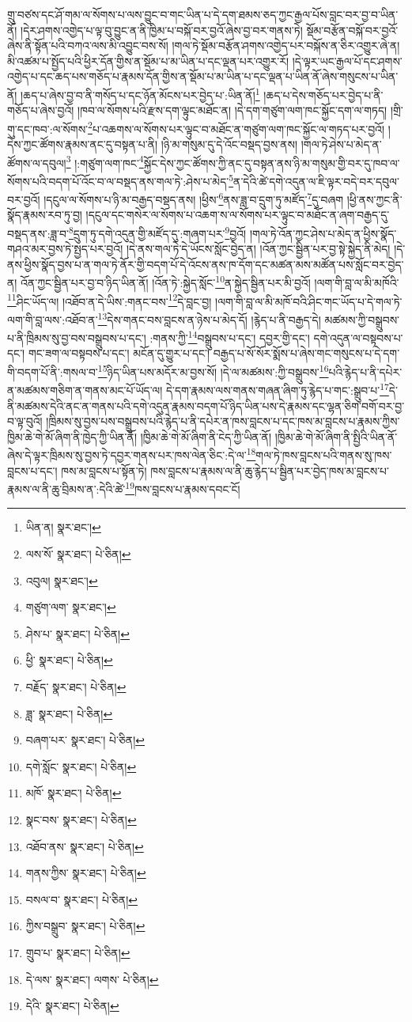 གྲུ་བཙས་དང་ཤོ་གམ་ལ་སོགས་པ་ལས་བྱུང་བ་གང་ཡིན་པ་དེ་དག་ཐམས་ཅད་ཀྱང་རྒྱལ་པོས་བླང་བར་བྱ་བ་ཡིན་ནོ། །དེར་ཤགས་འགྱེད་པ་ལྟ་བུ་བྱུང་ན་ནི་ཁྱིམ་པ་བསྐོ་བར་བྱའོ་ཞེས་བྱ་བར་གནས་ཏེ། སྡོམ་བརྩོན་བསྐོ་བར་བྱའོ་ཞེས་ནི་སྟོན་པའི་བཀའ་ལས་མི་འབྱུང་བས་སོ། །གལ་ཏེ་སྡོམ་བརྩོན་ཤགས་འགྱེད་པར་བསྐོས་ན་ཅིར་འགྱུར་ཞེ་ན། མི་འཚམ་པ་སྤྱོད་པའི་ཕྱིར་དོན་གྱིས་ན་སྡོམ་པ་མ་ཡིན་པ་དང་ལྡན་པར་འགྱུར་རོ། །དེ་ལྟར་ཡང་རྒྱལ་པོ་དང་ཤགས་འགྱེད་པ་དང་ཆད་པས་གཅོད་པ་རྣམས་དོན་གྱིས་ན་སྡོམ་པ་མ་ཡིན་པ་དང་ལྡན་པ་ཡིན་ནོ་ཞེས་གསུངས་པ་ཡིན་ནོ། །ཆད་པ་ཞེས་བྱ་བ་ནི་གསོད་པ་དང་ཉོན་མོངས་པར་བྱེད་པ་:ཡིན་ནོ།\footnote{ཡིན་ན།  སྣར་ཐང་། } །ཆད་པ་དེས་གཅོད་པར་བྱེད་པ་ནི་གཅོད་པ་ཞེས་བྱའོ། །ཁབ་ལ་སོགས་པའི་རྫས་དག་ལྟུང་མཐོང་ན། །དེ་དག་གཙུག་ལག་ཁང་སྐྱོང་དག་ལ་གཏད། །གྲི་གུ་དང་ཁབ་:ལ་སོགས་\footnote{ལས་སོ་  སྣར་ཐང་།  པེ་ཅིན། }པ་འཆགས་ལ་སོགས་པར་ལྟུང་བ་མཐོང་ན་གཙུག་ལག་ཁང་སྐྱོང་ལ་གཏད་པར་བྱའོ། །དེས་ཀྱང་ཚོགས་རྣམས་ནང་དུ་བསྟན་པ་ནི། །ཉི་མ་གསུམ་དུ་དེ་འོང་བསྡད་བྱས་ནས། །གལ་ཏེ་ཤེས་པ་མེད་ན་ཚོགས་ལ་དབུལ།\footnote{འབུལ།  སྣར་ཐང་། } །:གཙུག་ལག་ཁང་\footnote{གཙུག་ལག་  སྣར་ཐང་། }སྐྱོང་དེས་ཀྱང་ཚོགས་ཀྱི་ནང་དུ་བསྟན་ནས་ཉི་མ་གསུམ་གྱི་བར་དུ་ཁབ་ལ་སོགས་པའི་བདག་པོ་འོང་བ་ལ་བསྡད་ནས་གལ་ཏེ་:ཤེས་པ་མེད་\footnote{ཤེས་པ་  སྣར་ཐང་།  པེ་ཅིན། }ན་དེའི་ཚེ་དགེ་འདུན་ལ་ཇི་ལྟར་བདེ་བར་དབུལ་བར་བྱའོ། །དངུལ་ལ་སོགས་པ་ཉི་མ་བརྒྱད་བསྡད་ནས། །ཕྱིས་\footnote{ཕྱི་  སྣར་ཐང་།  པེ་ཅིན། }ནས་ཟླ་བ་དྲུག་ཏུ་མཛོད་\footnote{བརྗོད་  སྣར་ཐང་།  པེ་ཅིན། }དུ་བཞག །ཕྱི་ནས་ཀྱང་ནི་སྣོད་རྣམས་རབ་ཏུ་བྱ། །དངུལ་དང་གསེར་ལ་སོགས་པ་འཆག་ས་ལ་སོགས་པར་ལྟུང་བ་མཐོང་ན་ཞག་བརྒྱད་དུ་བསྡད་ནས་:ཟླ་བ་\footnote{ཟླ་  སྣར་ཐང་།  པེ་ཅིན། }དྲུག་ཏུ་དགེ་འདུན་གྱི་མཛོད་དུ་:གཞག་པར་\footnote{བཞག་པར་  སྣར་ཐང་།  པེ་ཅིན། }བྱའོ། །གལ་ཏེ་འོན་ཀྱང་ཤེས་པ་མེད་ན་ཕྱིས་སྣོད་གཤའ་མར་བྱས་ཏེ་སྤྱད་པར་བྱའོ། །དེ་ནས་གལ་ཏེ་དེ་ཡོངས་སློང་བྱེད་ན། །འོན་ཀྱང་སྦྱིན་པར་བྱ་སྟེ་སྐྱེད་ནི་མེད། །དེ་ནས་ཕྱིས་སྣོད་བྱས་པ་ན་གལ་ཏེ་ནོར་གྱི་བདག་པོ་དེ་འོངས་ནས་ཁ་དོག་དང་མཚན་མས་མཚོན་པས་སློང་བར་བྱེད་ན། འོན་ཀྱང་སྦྱིན་པར་བྱ་བ་ཉིད་ཡིན་ནོ། །འོན་ཏེ་:སྐྱེད་སློང་\footnote{དགེ་སློང་  སྣར་ཐང་།  པེ་ཅིན། }ན་སྐྱེད་སྦྱིན་པར་མི་བྱའོ། །ལག་གི་བླ་ལ་མི་མཁོའི་\footnote{མཁོ་  སྣར་ཐང་།  པེ་ཅིན། }ཤིང་ཡོད་ལ། །འཐོབ་ན་དེ་ཡིས་:གནང་བས་\footnote{སྣང་བས་  སྣར་ཐང་།  པེ་ཅིན། }དེ་བླང་བྱ། །ལག་གི་བླ་ལ་མི་མཁོ་བའི་ཤིང་གང་ཡོད་པ་དེ་གལ་ཏེ་ལག་གི་བླ་ལས་:འཐོབ་ན་\footnote{འཐོབ་ནས་  སྣར་ཐང་།  པེ་ཅིན། }དེས་གནང་བས་བླངས་ན་ཉེས་པ་མེད་དོ། །རྙེད་པ་ནི་བརྒྱད་དེ། མཚམས་ཀྱི་བསྒྲུབས་པ་ནི་ཁྲིམས་སུ་བྱ་བས་བསྒྲུབས་པ་དང་། :གནས་ཀྱི་\footnote{གནས་ཀྱིས་  སྣར་ཐང་།  པེ་ཅིན། }བསྒྲུབས་པ་དང་། དབྱར་གྱི་དང་། དགེ་འདུན་ལ་བསྟབས་པ་དང་། གང་ཟག་ལ་བསྟབས་པ་དང་། མངོན་དུ་གྱུར་པ་དང་། བརྒྱད་པ་སོ་སོར་སྨོས་པ་ཞེས་གང་གསུངས་པ་དེ་དག་གི་བདག་པོ་ནི་:གསལ་བ་\footnote{བསལ་བ་  སྣར་ཐང་།  པེ་ཅིན། }ཉིད་ཡིན་པས་མདོར་མ་བྱས་སོ། །དེ་ལ་མཚམས་:ཀྱི་བསྒྲུབས་\footnote{ཀྱིས་བསྒྲུབ་  སྣར་ཐང་།  པེ་ཅིན། }པའི་རྙེད་པ་ནི་དཔེར་ན་མཚམས་གཅིག་ན་གནས་མང་པོ་ཡོད་ལ། དེ་དག་རྣམས་ལས་གནས་གཞན་ཞིག་ཏུ་རྙེད་པ་གང་:སྒྲུབ་པ་\footnote{གྲུབ་པ་  སྣར་ཐང་།  པེ་ཅིན། }དེ་ནི་མཚམས་དེའི་ནང་ན་གནས་པའི་དགེ་འདུན་རྣམས་བདག་པོ་ཉིད་ཡིན་པས་དེ་རྣམས་དང་ལྷན་ཅིག་བགོ་བར་བྱ་བ་ལྟ་བུའོ། །ཁྲིམས་སུ་བྱས་པས་བསྒྲུབས་པའི་རྙེད་པ་ནི་དཔེར་ན་ཁས་བླངས་པ་དང་ཁས་མ་བླངས་པ་རྣམས་ཀྱིས་ཁྱིམ་ཆེ་གེ་མོ་ཞིག་ནི་ཁྱེད་ཀྱི་ཡིན་ནོ། །ཁྱིམ་ཆེ་གེ་མོ་ཞིག་ནི་ངེད་ཀྱི་ཡིན་ནོ། །ཁྱིམ་ཆེ་གེ་མོ་ཞིག་ནི་སྤྱིའི་ཡིན་ནོ་ཞེས་དེ་ལྟར་ཁྲིམས་སུ་བྱས་ཏེ་དབྱར་གནས་པར་ཁས་ལེན་ཅིང་:དེ་ལ་\footnote{དེ་ལས་  སྣར་ཐང་། ལགས་  པེ་ཅིན། }གལ་ཏེ་ཁས་བླངས་པའི་གནས་སུ་ཁས་བླངས་པ་དང་། ཁས་མ་བླངས་པ་སྟོན་ཏེ། ཁས་བླངས་པ་རྣམས་ལ་ནི་ཆུ་རྙེད་པ་སྦྱིན་པར་བྱེད་ཁས་མ་བླངས་པ་རྣམས་ལ་ནི་ཆུ་བྲིམས་ན་:དེའི་ཚེ་\footnote{དེའི་  སྣར་ཐང་།  པེ་ཅིན། }ཁས་བླངས་པ་རྣམས་དབང་ངོ། 